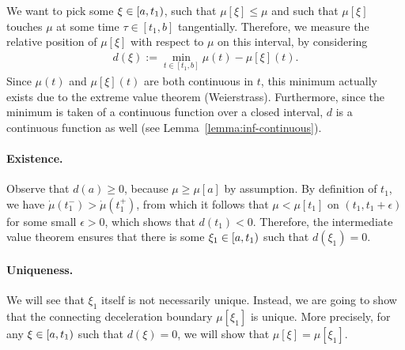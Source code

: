 \documentclass[a4paper]{article}
\theoremstyle{definition}
\theoremstyle{plain}
\begin{document}
We want to pick some $\xi \in [a,t_{1})$, such that $\mu[\xi] \leq \mu$
and such that $\mu[\xi]$ touches $\mu$ at some time $\tau \in [t_{1}, b]$
tangentially. Therefore, we measure the relative position of $\mu[\xi]$ with
respect to $\mu$ on this interval, by considering
\begin{align}
  d(\xi) := \min_{t \in [t_{1}, b]} \mu(t) - \mu[\xi](t) .
\end{align}
Since $\mu(t)$ and $\mu[\xi](t)$ are both continuous in $t$, this minimum actually exists
due to the extreme value theorem (Weierstrass).
%
Furthermore, since the minimum is taken of a continuous function over a closed
interval, $d$ is a continuous function as well (see Lemma~\ref{lemma:inf-continuous}).

\paragraph{Existence.}
Observe that $d(a) \geq 0$, because $\mu \geq \mu[a]$ by assumption.
%
By definition of $t_{1}$, we have $\dot{\mu}(t_{1}^{-}) > \dot{\mu}(t_{1}^{+})$,
from which it follows that $\mu < \mu[t_{1}]$ on $(t_{1}, t_{1} + \epsilon)$ for some small
$\epsilon > 0$, which shows that $d(t_{1}) < 0$.
%
Therefore, the intermediate value theorem ensures that there is some
$\xi_{1} \in [a,t_{1})$ such that $d(\xi_{1}) = 0$.

\paragraph{Uniqueness.}
We will see that $\xi_{1}$ itself is not necessarily unique. Instead, we are
going to show that the connecting deceleration boundary $\mu[\xi_{1}]$ is unique. More
precisely, for any $\xi \in [a,t_{1})$ such that $d(\xi) = 0$, we will show
that $\mu[\xi] = \mu[\xi_{1}]$.
\end{document}
